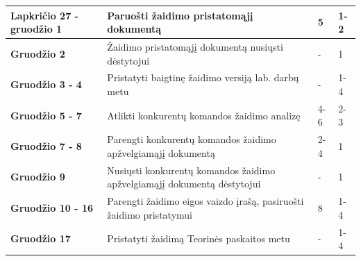 \documentclass{VUMIFPSkursinis}
\begin{document}
{\begin{longtable}{|L{3,4cm}|L{8,2cm}|L{1,5cm}|L{1,6cm}|}
\textbf{Lapkričio 27 - gruodžio 1} &
Paruošti žaidimo pristatomąjį dokumentą &
5 & 1-2 \\ \hline

\textbf{Gruodžio 2} &
Žaidimo pristatomąjį dokumentą nusiųsti dėstytojui &
- & 1 \\ \hline

\textbf{Gruodžio 3 - 4} &
Pristatyti baigtinę žaidimo versiją lab. darbų metu &
- & 1-4 \\ \hline

\textbf{Gruodžio 5 - 7} &
Atlikti konkurentų komandos žaidimo analizę &
4-6 & 2-3 \\ \hline

\textbf{Gruodžio 7 - 8} &
Parengti konkurentų komandos žaidimo apžvelgiamąjį dokumentą &
2-4 & 1 \\ \hline

\textbf{Gruodžio 9} &
Nusiųsti konkurentų komandos žaidimo apžvelgiamąjį dokumentą dėstytojui &
- & 1 \\ \hline

\textbf{Gruodžio 10 - 16} &
Parengti žaidimo eigos vaizdo įrašą, pasiruošti žaidimo pristatymui &
8 & 1-4 \\ \hline

\textbf{Gruodžio 17} &
Pristatyti žaidimą Teorinės paskaitos metu &
- & 1-4 \\ \hline

\end{longtable}}
\end{document}
